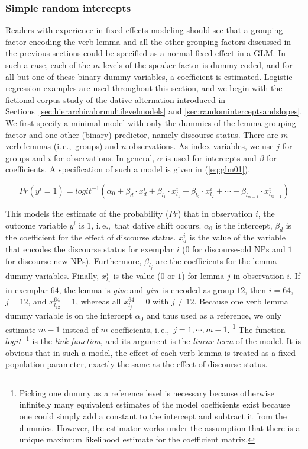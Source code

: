 \documentclass[a4paper,12pt]{article}
\newcommand{\ie}{i.\,e.,\ }
\begin{document}
\subsubsection{Simple random intercepts}
\label{sec:simplerandomintercepts}

Readers with experience in fixed effects modeling should see that a grouping factor encoding the verb lemma and all the other grouping factors discussed in the previous sections could be specified as a normal fixed effect in a GLM.
In such a case, each of the $m$ levels of the speaker factor is dummy-coded, and for all but one of these binary dummy variables, a coefficient is estimated.
Logistic regression examples are used throughout this section, and we begin with the fictional corpus study of the dative alternation introduced in Sections~\ref{sec:hierarchicalormultilevelmodels} and \ref{sec:randominterceptsandslopes}.
We first specify a minimal model with only the dummies of the lemma grouping factor and one other (binary) predictor, namely discourse status.
There are $m$ verb lemmas (\ie groups) and $n$ observations.
As index variables, we use $j$ for groups and $i$ for observations.
In general, $\alpha$ is used for intercepts and $\beta$ for coefficients.
A specification of such a model is given in (\ref{eq:glm01}).

\begin{equation}
  Pr(y^i=1)=logit^{-1}(\alpha_0+\beta_d\cdot x_{d}^i+\beta_{l_1}\cdot x_{l_1}^i+\beta_{l_2}\cdot x_{l_2}^i+\cdots+\beta_{l_{m-1}}\cdot x_{l_{m-1}}^i)
  \label{eq:glm01}
\end{equation}

This models the estimate of the probability ($Pr$) that in observation $i$, the outcome variable $y^i$ is $1$, \ie that dative shift occurs.
$\alpha_0$ is the intercept, $\beta_d$ is the coefficient for the effect of discourse status.
$x_d^i$ is the value of the variable that encodes the discourse status for exemplar $i$ ($0$ for discourse-old NPs and $1$ for discourse-new NPs).
Furthermore, $\beta_{l_j}$ are the coefficients for the lemma dummy variables.
Finally, $x_{l_j}^i$ is the value ($0$ or $1$) for lemma $j$ in observation $i$.
If in exemplar $64$, the lemma is \textit{give} and \textit{give} is encoded as group $12$, then $i=64$, $j=12$, and $x_{l_{12}}^{64}=1$, whereas all $x_{l_j}^{64}=0$ with $j\neq12$.
Because one verb lemma dummy variable is on the intercept $\alpha_0$ and thus used as a reference, we only estimate $m-1$ instead of $m$ coefficients, \ie $j=1,\cdots,m-1$.%
\footnote{Picking one dummy as a reference level is necessary because otherwise infinitely many equivalent estimates of the model coefficients exist because one could simply add a constant to the intercept and subtract it from the dummies.
However, the estimator works under the assumption that there is a unique maximum likelihood estimate for the coefficient matrix.}
The function $logit^{-1}$ is the \textit{link function}, and its argument is the \textit{linear term} of the model.
It is obvious that in such a model, the effect of each verb lemma is treated as a fixed population parameter, exactly the same as the effect of discourse status.
\end{document}
